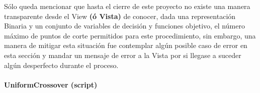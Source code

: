 \documentclass[class=report, crop=false]{standalone}
\begin{document}
\begin{fulllineitems}
\begin{DUlineblock}{0em}
Sólo queda mencionar que hasta el cierre de este proyecto 
no existe una manera transparente desde el View \textbf{(ó Vista)} 
de conocer, dada una representación Binaria y un conjunto de variables 
de decisión y funciones objetivo, el número máximo de puntos de 
corte permitidos para este procedimiento, sin embargo, una manera 
de mitigar esta situación fue contemplar algún posible caso de error 
en esta sección y mandar un mensaje de error a la Vista por si 
llegase a suceder algún desperfecto durante el proceso.
\end{DUlineblock}

\end{fulllineitems}

\paragraph{UniformCrossover (script)}
\label{sec:a_2_4_2_2}
\end{document}
